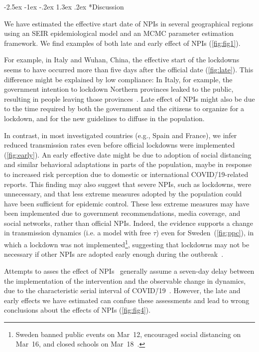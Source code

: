 \documentclass[12pt]{extarticle}
\makeatletter
\renewcommand\section{\@startsection {section}{1}{\z@}%
     {-2.5ex \@plus -1ex \@minus -.2ex}%
     {1.3ex \@plus.2ex}%
    {\Large\bfseries}}
\makeatother
\begin{document}
\pagebreak
\section*{Discussion}

We have estimated the effective start date of NPIs in several geographical regions using an SEIR epidemiological model and an MCMC parameter estimation framework.
We find examples of both late and early effect of NPIs (\autoref{fig:fig1}).

For example, in Italy and Wuhan, China, the effective start of the lockdowns seems to have occurred more than five days after the official date (\autoref{fig:late}).
This difference might be explained by low compliance: In Italy, for example, the government intention to lockdown Northern provinces leaked to the public, resulting in people leaving those provinces~\citep{Gatto2020}.
Late effect of NPIs might also be due to the time required by both the government and the citizens to organize for a lockdown, and for the new guidelines to diffuse in the population.
 
In contrast, in most investigated countries (e.g., Spain and France), we infer reduced transmission rates even before official lockdowns were implemented (\autoref{fig:early}).
An early effective date might be due to adoption of social distancing and similar behavioral adaptations in parts of the population, maybe in response to increased risk perception due to domestic or international COVID\=/19-related reports.
This finding may also suggest that severe NPIs, such as lockdowns, were unnecessary, and that less extreme measures adopted by the population could have been sufficient for epidemic control.
These less extreme measures may have been implemented due to government recommendations, media coverage, and social networks, rather than official NPIs.
Indeed, the evidence supports a change in transmission dynamics (i.e. a model with free $\tau$) even for Sweden~(\autoref{fig:ppc}), in which a lockdown was not implemented\footnote{Sweden banned public events on Mar~12, encouraged social distancing on Mar~16, and closed schools on Mar~18~\citep{Flaxman2020}.}, suggesting that lockdowns may not be necessary if other NPIs are adopted early enough during the outbreak~\citep{Banholzer2020}.

Attempts to asses the effect of NPIs~\citep{Flaxman2020,Banholzer2020} generally assume a seven-day delay between the implementation of the intervention and the observable change in dynamics, due to the characteristic serial interval of COVID\=/19~\citep{Gatto2020}.
However, the late and early effects we have estimated can confuse these assessments and lead to wrong conclusions about the effects of NPIs (\autoref{fig:fig4}).
\end{document}
